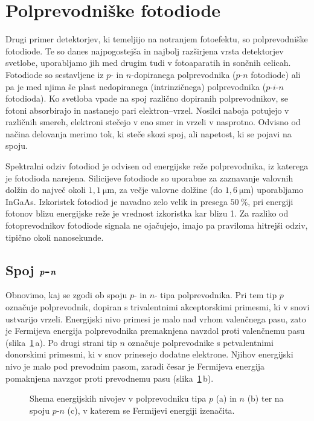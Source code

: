 \section{Polprevodniške fotodiode}
Drugi primer detektorjev, ki temeljijo na notranjem fotoefektu,
so polprevodniške fotodiode.
Te so danes najpogostejša in najbolj razširjena vrsta detektorjev svetlobe, uporabljamo jih med
drugim tudi v fotoaparatih in sončnih celicah. Fotodiode so sestavljene iz $p$- in $n$-dopiranega 
polprevodnika ($p$-$n$ fotodiode) ali pa je med njima še plast nedopiranega (intrinzičnega) 
polprevodnika ($p$-$i$-$n$ fotodioda). Ko svetloba vpade na spoj različno dopiranih polprevodnikov,
se fotoni absorbirajo in nastanejo 
pari elektron--vrzel. Nosilci naboja potujejo v različnih smereh, elektroni stečejo v eno smer in
vrzeli v nasprotno. Odvisno od načina delovanja merimo tok, ki steče skozi 
spoj, ali napetost, ki se pojavi na spoju. 

Spektralni odziv 
fotodiod je odvisen od energijske reže polprevodnika, 
iz katerega je fotodioda narejena.
Silicijeve  fotodiode so  uporabne za zaznavanje valovnih dolžin do največ okoli
$1,1~\si{\micro\meter}$, za večje valovne dolžine (do $1,6~\si{\micro\meter}$) 
uporabljamo InGaAs. Izkoristek fotodiod
je navadno zelo velik in presega $50~\%$, pri energiji fotonov blizu energijske reže 
je vrednost izkoristka kar blizu 1.
Za razliko od fotoprevodnikov fotodiode signala
ne ojačujejo, imajo pa praviloma hitrejši odziv, tipično okoli nanosekunde.

\subsection*{Spoj $\textbf{\textit{p}}$-$\textbf{\textit{n}}$}
Obnovimo, kaj se zgodi ob spoju $p$- in $n$- tipa polprevodnika. Pri tem tip $p$ označuje
polprevodnik, dopiran s trivalentnimi akceptorskimi primesmi, ki v snovi ustvarijo vrzeli.
Energijski nivo primesi je malo nad vrhom valenčnega pasu, zato je Fermijeva energija
polprevodnika premaknjena navzdol proti valenčnemu pasu (slika~\ref{11_PN1}\,a). 
Po drugi strani tip $n$ označuje polprevodnike s petvalentnimi 
donorskimi primesmi, ki v snov prinesejo dodatne elektrone. Njihov energijski nivo je malo 
pod prevodnim pasom, zaradi česar je Fermijeva energija pomaknjena navzgor proti prevodnemu pasu
(slika~\ref{11_PN1}\,b).
\begin{figure}[h]
\centering
\def\svgwidth{140truemm} 

\caption{Shema energijskih nivojev v polprevodniku tipa $p$ (a) in $n$ (b) ter na spoju $p$-$n$ (c), 
v katerem se Fermijevi energiji izenačita.}
\label{11_PN1}
\end{figure}


